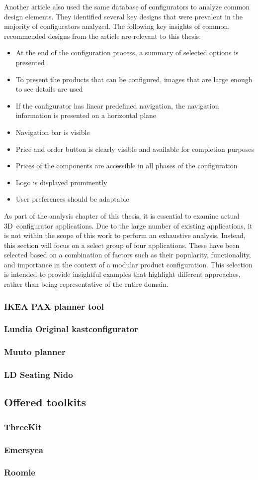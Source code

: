 Another article also used the same database of configurators to analyze common design elements. They identified several key designs that were prevalent in the majority of configurators analyzed. The following key insights of common, recommended designs from the article are relevant to this thesis: \cite{Leitner2014}
\begin{itemize}
    \item At the end of the configuration process, a summary of selected options is presented
    \item To present the products that can be configured, images that are large enough to see details are used
    \item If the configurator has linear predefined navigation, the navigation information is presented on a horizontal plane
    \item Navigation bar is visible
    \item Price and order button is clearly visible and available for completion purposes
    \item Prices of the components are accessible in all phases of the configuration
    \item Logo is displayed prominently
    \item User preferences should be adaptable
\end{itemize}

As part of the analysis chapter of this thesis, it is essential to examine actual 3D~configurator applications. Due to the large number of existing applications, it is not within the scope of this work to perform an exhaustive analysis. Instead, this section will focus on a select group of four applications. These have been selected based on a combination of factors such as their popularity, functionality, and importance in the context of a modular product configuration. This selection is intended to provide insightful examples that highlight different approaches, rather than being representative of the entire domain.

\subsubsection{IKEA PAX planner tool}
\subsubsection{Lundia Original kastconfigurator}
\subsubsection{Muuto planner}
\subsubsection{LD Seating Nido}

\subsection{Offered toolkits}

\subsubsection{ThreeKit}
\subsubsection{Emersyea}
\subsubsection{Roomle}